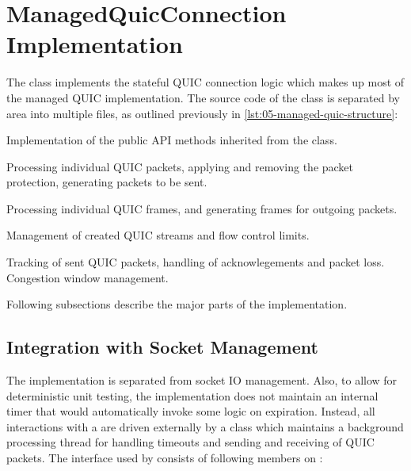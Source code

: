 \section{ManagedQuicConnection Implementation}

The \ManagedQuicConnection{} class implements the stateful QUIC connection logic which makes up most
of the managed QUIC implementation. The source code of the \ManagedQuicConnection{} class is
separated by area into multiple files, as outlined previously in
\autoref{lst:05-managed-quic-structure}:

\begin{itemize}

   Implementation of the public API methods inherited from the \QuicConnectionProvider{} class.

   Processing individual QUIC packets, applying and removing the packet protection, generating packets to be sent.

   Processing individual QUIC frames, and generating frames for outgoing packets.

   Management of created QUIC streams and flow control limits.

   Tracking of sent QUIC packets, handling of acknowlegements and packet loss. Congestion window management.

\end{itemize}

Following subsections describe the major parts of the implementation.

\subsection{Integration with Socket Management}

The \ManagedQuicConnection{} implementation is separated from socket IO management. Also, to allow
for deterministic unit testing, the implementation does not maintain an internal timer that would
automatically invoke some logic on expiration. Instead, all interactions with a \Socket{} are driven
externally by a \QuicConnectionContext{} class which maintains a background processing thread for
handling timeouts and sending and receiving of QUIC packets. The interface used by
\QuicConnectionContext{} consists of following members on \ManagedQuicConnection{}:

